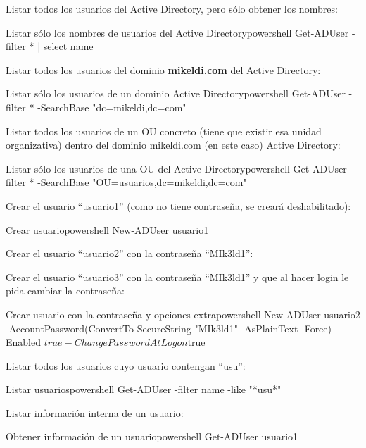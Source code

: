 Listar todos los usuarios del Active Directory, pero sólo obtener los nombres:
\begin{mycode}{Listar sólo los nombres de usuarios del Active Directory}{powershell}{}
Get-ADUser -filter * | select name
\end{mycode}


Listar todos los usuarios del dominio \textbf{mikeldi.com} del Active Directory:
\begin{mycode}{Listar sólo los  usuarios de un dominio Active Directory}{powershell}{}
Get-ADUser -filter * -SearchBase "dc=mikeldi,dc=com"
\end{mycode}


Listar todos los usuarios de un OU concreto (tiene que existir esa unidad organizativa) dentro del dominio mikeldi.com (en este caso) Active Directory:
\begin{mycode}{Listar sólo los  usuarios de una OU del Active Directory}{powershell}{}
Get-ADUser -filter * -SearchBase "OU=usuarios,dc=mikeldi,dc=com"
\end{mycode}

Crear el usuario “usuario1” (como no tiene contraseña, se creará deshabilitado):
\begin{mycode}{Crear usuario}{powershell}{}
New-ADUser usuario1
\end{mycode}

Crear el usuario “usuario2” con la contraseña “MIk3ld1”:

Crear el usuario “usuario3” con la contraseña “MIk3ld1” y que al hacer login le pida cambiar la contraseña:
\begin{mycode}{Crear usuario con la contraseña y opciones extra}{powershell}{}
New-ADUser usuario2 -AccountPassword(ConvertTo-SecureString "MIk3ld1"
-AsPlainText -Force) -Enabled $true -ChangePasswordAtLogon $true
\end{mycode}

Listar todos los usuarios cuyo usuario contengan “usu”:
\begin{mycode}{Listar usuarios}{powershell}{}
Get-ADUser -filter {name -like "*usu*"}
\end{mycode}

Listar información interna de un usuario:
\begin{mycode}{Obtener información de un usuario}{powershell}{}
Get-ADUser usuario1
\end{mycode}

